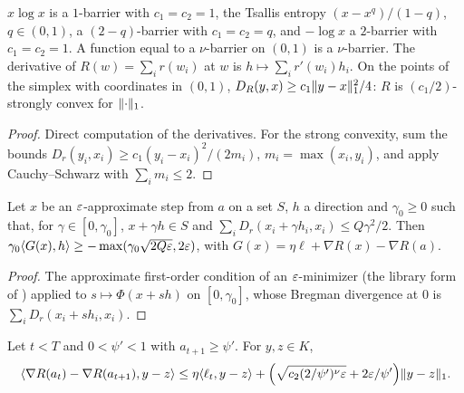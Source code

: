 \begin{lemma}
  \label{lem:barrier_examples}
  \leanok
  $x \log x$ is a $1$-barrier with $c_1 = c_2 = 1$, the Tsallis entropy $(x - x^q)/(1 - q)$,
  $q \in (0, 1)$, a $(2 - q)$-barrier with $c_1 = c_2 = q$, and $-\log x$ a $2$-barrier with
  $c_1 = c_2 = 1$. A function equal to a $\nu$-barrier on $(0, 1)$ is a $\nu$-barrier. The derivative
  of $R(w) = \sum_i r(w_i)$ at $w$ is $h \mapsto \sum_i r'(w_i)h_i$. On the points of the simplex
  with coordinates in $(0, 1)$, $D_R(y, x) \ge c_1\lVert y - x \rVert_1^2/4$: $R$ is
  $(c_1/2)$-strongly convex for $\lVert \cdot \rVert_1$.
\end{lemma}

\begin{proof}
  \leanok
  Direct computation of the derivatives. For the strong convexity, sum the bounds
  $D_r(y_i, x_i) \ge c_1(y_i - x_i)^2/(2m_i)$, $m_i = \max(x_i, y_i)$, and apply Cauchy--Schwarz
  with $\sum_i m_i \le 2$.
\end{proof}

\begin{lemma}
  \label{lem:bar_localized_foc}
  \leanok
  Let $x$ be an $\varepsilon$-approximate step from $a$ on a set $S$, $h$ a direction and $\gamma_0 \ge 0$
  such that, for $\gamma \in [0, \gamma_0]$, $x + \gamma h \in S$ and
  $\sum_i D_r(x_i + \gamma h_i, x_i) \le Q\gamma^2/2$. Then
  $\gamma_0\langle G(x), h \rangle \ge -\max(\gamma_0\sqrt{2Q\varepsilon}, 2\varepsilon)$, with
  $G(x) = \eta\ell + \nabla R(x) - \nabla R(a)$.
\end{lemma}

\begin{proof}
  \leanok
  The approximate first-order condition of an $\varepsilon$-minimizer (the library form of
  \cite[Lemma 22]{SSKM26}) applied to $s \mapsto \Phi(x + sh)$ on $[0, \gamma_0]$, whose Bregman
  divergence at $0$ is $\sum_i D_r(x_i + sh_i, x_i)$.
\end{proof}

\begin{lemma}
  \label{lem:bar_one_step_balance}
  \leanok
  Let $t < T$ and $0 < \psi' < 1$ with $a_{t+1} \ge \psi'$. For $y, z \in K$,
  \[ \langle \nabla R(a_t) - \nabla R(a_{t+1}), y - z \rangle \le \eta\langle \ell_t, y - z \rangle
    + \Bigl(\sqrt{c_2(2/\psi')^\nu\varepsilon} + 2\varepsilon/\psi'\Bigr)\lVert y - z \rVert_1. \]
\end{lemma}

